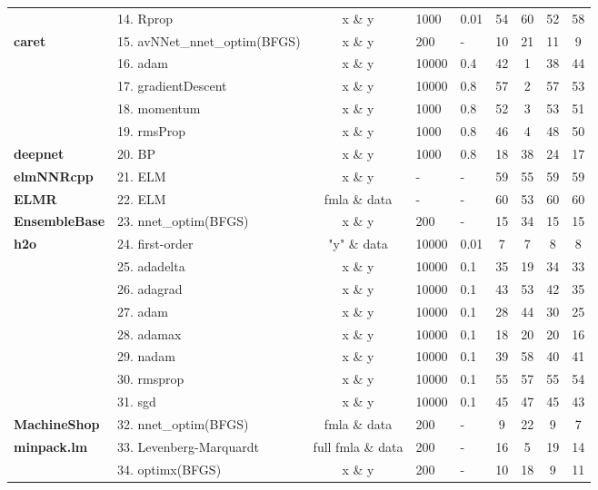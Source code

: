 \begin{Schunk}
\begin{table}
\begin{tabular}[t]{>{\bfseries}llcllcccc}
\multirow{-3}{*}{\raggedright\arraybackslash CaDENCE} & 14. Rprop & x \& y & 1000 & 0.01 & 54 & 60 & 52 & 58\\
\cmidrule{1-9}
caret & 15. avNNet\_nnet\_optim(BFGS) & x \& y & 200 & - & 10 & 21 & 11 & 9\\
\cmidrule{1-9}
 & 16. adam & x \& y & 10000 & 0.4 & 42 & 1 & 38 & 44\\

 & 17. gradientDescent & x \& y & 10000 & 0.8 & 57 & 2 & 57 & 53\\

 & 18. momentum & x \& y & 1000 & 0.8 & 52 & 3 & 53 & 51\\

\multirow{-4}{*}{\raggedright\arraybackslash deepdive} & 19. rmsProp & x \& y & 1000 & 0.8 & 46 & 4 & 48 & 50\\
\cmidrule{1-9}
deepnet & 20. BP & x \& y & 1000 & 0.8 & 18 & 38 & 24 & 17\\
\cmidrule{1-9}
elmNNRcpp & 21. ELM & x \& y & - & - & 59 & 55 & 59 & 59\\
\cmidrule{1-9}
ELMR & 22. ELM & fmla \& data & - & - & 60 & 53 & 60 & 60\\
\cmidrule{1-9}
EnsembleBase & 23. nnet\_optim(BFGS) & x \& y & 200 & - & 15 & 34 & 15 & 15\\
\cmidrule{1-9}
h2o & 24. first-order & "y" \& data & 10000 & 0.01 & 7 & 7 & 8 & 8\\
\cmidrule{1-9}
 & 25. adadelta & x \& y & 10000 & 0.1 & 35 & 19 & 34 & 33\\

 & 26. adagrad & x \& y & 10000 & 0.1 & 43 & 53 & 42 & 35\\

 & 27. adam & x \& y & 10000 & 0.1 & 28 & 44 & 30 & 25\\

 & 28. adamax & x \& y & 10000 & 0.1 & 18 & 20 & 20 & 16\\

 & 29. nadam & x \& y & 10000 & 0.1 & 39 & 58 & 40 & 41\\

 & 30. rmsprop & x \& y & 10000 & 0.1 & 55 & 57 & 55 & 54\\

\multirow{-7}{*}{\raggedright\arraybackslash keras} & 31. sgd & x \& y & 10000 & 0.1 & 45 & 47 & 45 & 43\\
\cmidrule{1-9}
MachineShop & 32. nnet\_optim(BFGS) & fmla \& data & 200 & - & 9 & 22 & 9 & 7\\
\cmidrule{1-9}
minpack.lm & 33. Levenberg-Marquardt & full fmla \& data & 200 & - & 16 & 5 & 19 & 14\\
\cmidrule{1-9}
 & 34. optimx(BFGS) & x \& y & 200 & - & 10 & 18 & 9 & 11\\


\end{tabular}
\end{table}
\end{Schunk}
